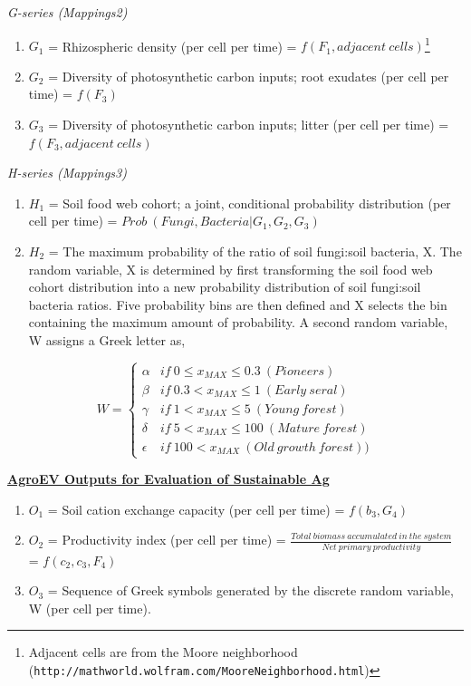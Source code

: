 \noindent \textit{G-series (Mappings2)}
\begin{enumerate}
  \item $G_1$ = Rhizospheric density (per cell per time) = $f(F_1, adjacent \ cells)$\footnote{Adjacent cells are from the Moore neighborhood (\verb!http://mathworld.wolfram.com/MooreNeighborhood.html!)}   
  \item $G_2$ = Diversity of photosynthetic carbon inputs; root exudates (per cell per time) = $f(F_3)$
  \item $G_3$ = Diversity of photosynthetic carbon inputs; litter (per cell per time) = $f(F_3, adjacent \ cells)$
 \end{enumerate}  
  
\noindent \textit{H-series (Mappings3)}
\begin{enumerate}  
  \item $H_1$ = Soil food web cohort; a joint, conditional probability distribution (per cell per time) = $ Prob \ (Fungi, Bacteria | G_1, G_2, G_3)$
  \item $H_2$ = The maximum probability of the ratio of soil fungi:soil bacteria, X. The random variable, X is determined by first transforming the soil food web cohort distribution into a new probability distribution of soil fungi:soil bacteria ratios.  Five probability bins are then defined and X selects the bin containing the maximum amount of probability. A second random variable, W assigns a Greek letter as,  
 \end{enumerate}

\[ W = \begin{cases} 
      \alpha  & if \ 0\leq x_{MAX} \leq 0.3  \ (Pioneers) \\
      \beta  & if \ 0.3 < x_{MAX} \leq 1 \ (Early \ seral) \\
      \gamma  & if \ 1 < x_{MAX} \leq 5 \ (Young \ forest)\\
      \delta & if \ 5 < x_{MAX} \leq 100  \  (Mature \ forest)\\
      \epsilon & if \ 100 < x_{MAX}  \ (Old \ growth \ forest))
   \end{cases}
\]

\vspace{5 mm}

\noindent \textbf{\underline{AgroEV Outputs for Evaluation of Sustainable Ag }}\\
\begin{enumerate}
  \item $O_1$ = Soil cation exchange capacity (per cell per time) = $f(b_3, G_4)$
  \item $O_2$ = Productivity index (per cell per time) = $ \frac{Total \ biomass \ accumulated \ in \ the \ system}{Net \ primary \ productivity}$ = $ f(c_2, c_3, F_4)$
  \item $O_3$ = Sequence of Greek symbols generated by the discrete random variable, W  (per cell per time).
\end{enumerate}



